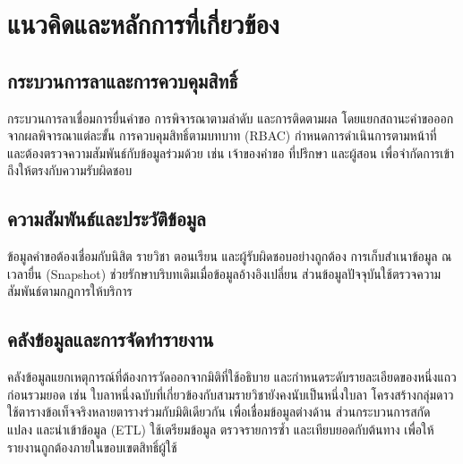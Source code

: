 \section{แนวคิดและหลักการที่เกี่ยวข้อง}
\subsection{กระบวนการลาและการควบคุมสิทธิ์}
กระบวนการลาเชื่อมการยื่นคำขอ การพิจารณาตามลำดับ และการติดตามผล
โดยแยกสถานะคำขอออกจากผลพิจารณาแต่ละขั้น \cite{proposal,repo}
การควบคุมสิทธิ์ตามบทบาท (RBAC) กำหนดการดำเนินการตามหน้าที่ \cite{rbac}
และต้องตรวจความสัมพันธ์กับข้อมูลร่วมด้วย เช่น
เจ้าของคำขอ ที่ปรึกษา และผู้สอน เพื่อจำกัดการเข้าถึงให้ตรงกับความรับผิดชอบ

\subsection{ความสัมพันธ์และประวัติข้อมูล}
ข้อมูลคำขอต้องเชื่อมกับนิสิต รายวิชา ตอนเรียน และผู้รับผิดชอบอย่างถูกต้อง
การเก็บสำเนาข้อมูล ณ เวลายื่น (Snapshot)
ช่วยรักษาบริบทเดิมเมื่อข้อมูลอ้างอิงเปลี่ยน
ส่วนข้อมูลปัจจุบันใช้ตรวจความสัมพันธ์ตามกฎการให้บริการ \cite{repo,components}

\subsection{คลังข้อมูลและการจัดทำรายงาน}
คลังข้อมูลแยกเหตุการณ์ที่ต้องการวัดออกจากมิติที่ใช้อธิบาย
และกำหนดระดับรายละเอียดของหนึ่งแถวก่อนรวมยอด \cite{grain}
เช่น ใบลาหนึ่งฉบับที่เกี่ยวข้องกับสามรายวิชายังคงนับเป็นหนึ่งใบลา
โครงสร้างกลุ่มดาวใช้ตารางข้อเท็จจริงหลายตารางร่วมกับมิติเดียวกัน
เพื่อเชื่อมข้อมูลต่างด้าน \cite{galaxy}
ส่วนกระบวนการสกัด แปลง และนำเข้าข้อมูล (ETL)
ใช้เตรียมข้อมูล ตรวจรายการซ้ำ และเทียบยอดกับต้นทาง
เพื่อให้รายงานถูกต้องภายในขอบเขตสิทธิ์ผู้ใช้ \cite{warehouse}
